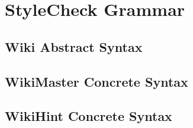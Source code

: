 
\chapter{StyleCheck Grammar}
\label{app:code}


\section{Wiki Abstract Syntax}



\section{WikiMaster Concrete Syntax}



\section{WikiHint Concrete Syntax}



